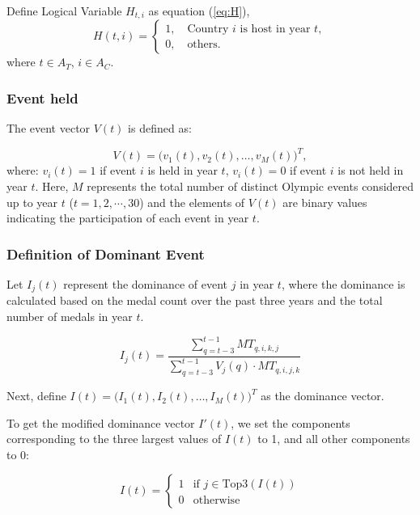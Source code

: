 \documentclass{mcmthesis}
\begin{document}
	Define Logical Variable $H_{t,i}$ as equation (\ref{eq:H}),
	\begin{equation}
		H(t,i)=
		\begin{cases}
			1, \quad \text{Country } i \text{ is host in year } t, \\
			0, \quad \text{others}.
		\end{cases}
		\label{eq:H}
	\end{equation}
	where $t\in A_{T}$, $i\in A_{C}$.
	
	
	
	\subsubsection{Event held}
	The event vector \( V(t) \) is defined as:
	
	\[
	V(t) = \big( v_1(t), v_2(t), \dots, v_M(t) \big)^T,
	\]
	where: \( v_i(t) = 1 \) if event \( i \) is held in year \( t \),
	\( v_i(t) = 0 \) if event \( i \) is not held in year \( t \). Here, \( M \) represents the total number of distinct Olympic events considered up to year \( t \) ($t=1,2,\cdots,30$) and the elements of \( V(t) \) are binary values indicating the participation of each event in year \( t \).
	
	
	
	\subsubsection{Definition of Dominant Event}
	
	Let \( I_j(t) \) represent the dominance of event \( j \) in year \( t \), where the dominance is calculated based on the medal count over the past three years and the total number of medals in year \( t \).
	
	\[
	I_j(t) = \frac{\sum_{q=t-3}^{t-1} MT_{q,i,k,j}}{\sum_{q=t-3}^{t-1} V_j(q) \cdot MT_{q,i,j,k}} 
	\]
	
	Next, define \( I(t) = \big( I_1(t), I_2(t), \dots, I_M(t) \big)^T \) as the dominance vector. 
	
	To get the modified dominance vector \( I'(t) \), we set the components corresponding to the three largest values of \( I(t) \) to 1, and all other components to 0:
	
	\[
	\hat{I}(t) = 
	\begin{cases} 
		1 & \text{if } j \in \text{Top3}(I(t)) \\
		0 & \text{otherwise}
	\end{cases}
	\]
	
\end{document}
